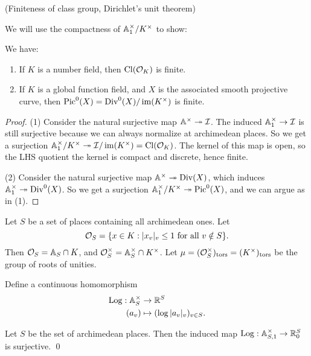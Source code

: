 \documentclass[11pt]{amsart}
\begin{document}
(Finiteness of class group, Dirichlet's unit theorem)

We will use the compactness of $\AA_1^\times/K^\times$ to show:

\begin{thm}
We have:
    \begin{enumerate}
        \item If $K$ is a number field, then $\Cl(\cO_K)$ is finite.
        \item If $K$ is a global function field, and $X$ is the associated smooth projective curve, then $\Pic^0(X) = \Div^0(X)/\im(K^{\times})$ is finite.
    \end{enumerate}
\end{thm}


\begin{proof}
    (1) Consider the natural surjective map $\AA^{\times}\onto\cI$. The induced $\AA^{\times}_1\to \cI$ is still surjective because we can always normalize at archimedean places. So we get a surjection $\AA_1^{\times}/K^{\times} \onto \cI/\im(K^{\times}) = \Cl(\cO_K)$. The kernel of this map is open, so the LHS quotient the kernel is compact and discrete, hence finite.

    (2) Consider the natural surjective map $\AA^{\times}\onto\Div(X)$, which induces $\AA_1^{\times}\onto \Div^0(X)$. So we get a surjection $\AA_1^{\times}/K^{\times} \onto \Pic^0(X)$, and we can argue as in (1).
\end{proof}

\begin{defn}
    Let $S$ be a set of places containing all archimedean ones. Let 
    \[\cO_S = \{x\in K: |x_v|_v\le 1 \text{ for all } v\notin S\}.\] 
    Then $\cO_S = \AA_S\cap K$, and $\cO_S^{\times} = \AA_S^{\times}\cap K^{\times}$. Let $\mu = (\cO_S^{\times})_{\tors} = (K^{\times})_{\tors}$ be the group of roots of unities.
\end{defn}


Define a continuous homomorphism
\begin{align*}
    \Log: \AA_S^{\times} &\to \RR^S \\
    (a_v) &\mapsto (\log |a_v|_v)_{v\in S}.
\end{align*}

\begin{lem}
    Let $S$ be the set of archimedean places. Then the induced map $\Log: \AA^{\times}_{S,1}\to \RR^S_0$ is surjective. \qed
\end{lem}
\end{document}
